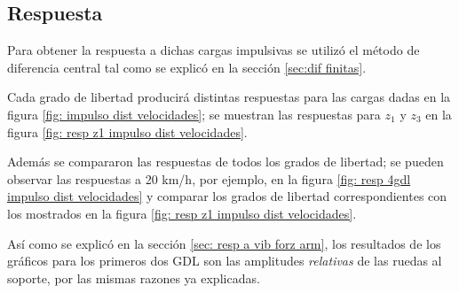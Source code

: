 \documentclass[oneside, a4paper, spanish, links]{amca}
\begin{document}
\subsection{Respuesta}

Para obtener la respuesta a dichas cargas impulsivas se utilizó el método de diferencia central tal como se explicó en la sección \ref{sec:dif finitas}. 

Cada grado de libertad producirá distintas respuestas para las cargas dadas en la figura \ref{fig: impulso dist velocidades}; se muestran las respuestas para \textit{${z_1}$} y \textit{$ {z_3}$} en la figura \ref{fig: resp z1 impulso dist velocidades}.

Además se compararon las respuestas de todos los grados de libertad; se pueden observar las respuestas a 20 km/h, por ejemplo, en la figura \ref{fig: resp 4gdl impulso dist velocidades} y comparar los grados de libertad correspondientes con los mostrados en la figura \ref{fig: resp z1 impulso dist velocidades}.

Así como se explicó en la sección \ref{sec: resp a vib forz arm}, los resultados de los gráficos para los primeros dos GDL son las amplitudes \textit{relativas} de las ruedas al soporte, por las mismas razones ya explicadas.  
\end{document}
